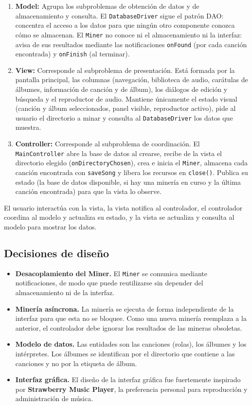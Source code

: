 \documentclass[12pt,a4paper]{article}
\begin{document}
\begin{enumerate}
  \item \textbf{Model:} Agrupa los subproblemas de obtención de datos y de almacenamiento y consulta. El \texttt{DatabaseDriver} sigue el patrón DAO: concentra el acceso a los datos para que ningún otro componente conozca cómo se almacenan. El \texttt{Miner} no conoce ni el almacenamiento ni la interfaz: avisa de sus resultados mediante las notificaciones \texttt{onFound} (por cada canción encontrada) y \texttt{onFinish} (al terminar).
  \item \textbf{View:} Corresponde al subproblema de presentación. Está formada por la pantalla principal, las columnas (navegación, biblioteca de audio, carátulas de álbumes, información de canción y de álbum), los diálogos de edición y búsqueda y el reproductor de audio. Mantiene únicamente el estado visual (canción y álbum seleccionados, panel visible, reproductor activo), pide al usuario el directorio a minar y consulta al \texttt{DatabaseDriver} los datos que muestra.
  \item \textbf{Controller:} Corresponde al subproblema de coordinación. El \texttt{MainController} abre la base de datos al crearse, recibe de la vista el directorio elegido (\texttt{onDirectoryChosen}), crea e inicia el \texttt{Miner}, almacena cada canción encontrada con \texttt{saveSong} y libera los recursos en \texttt{close()}. Publica su estado (la base de datos disponible, si hay una minería en curso y la última canción encontrada) para que la vista lo observe.
\end{enumerate}
 
El usuario interactúa con la vista, la vista notifica al controlador, el controlador coordina al modelo y actualiza su estado, y la vista se actualiza y consulta al modelo para mostrar los datos.
 
\subsection{Decisiones de diseño}
\begin{itemize}
  \item \textbf{Desacoplamiento del Miner.} El \texttt{Miner} se comunica mediante notificaciones, de modo que puede reutilizarse sin depender del almacenamiento ni de la interfaz.
  \item \textbf{Minería asíncrona.} La minería se ejecuta de forma independiente de la interfaz para que esta no se bloquee. Como una nueva minería reemplaza a la anterior, el controlador debe ignorar los resultados de las mineras obsoletas.
  \item \textbf{Modelo de datos.} Las entidades son las canciones (rolas), los álbumes y los intérpretes. Los álbumes se identifican por el directorio que contiene a las canciones y no por la etiqueta de álbum.
  \item \textbf{Interfaz gráfica.} El diseño de la interfaz gráfica fue fuertemente inspirado por \textbf{Strawberry Music Player}, la preferencia personal para reproducción y administración de música.
\end{itemize}
 
\end{document}
